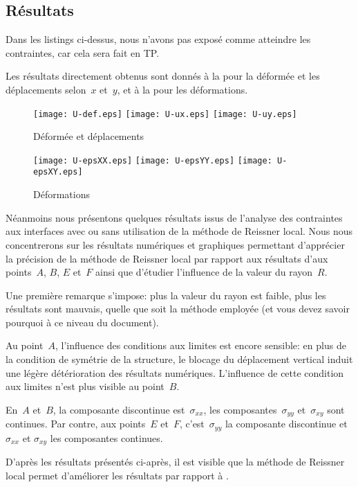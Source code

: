 \medskip
\subsection{Résultats}

Dans les listings ci-dessus, nous n'avons pas exposé comme atteindre les contraintes, car cela sera fait en TP.

Les résultats directement obtenus sont donnés à la  pour la déformée et les déplacements selon~$x$ et~$y$, et à la  pour les déformations.
\begin{figure}[h!]
  \texttt{[image: U-def.eps]} \hfill
  \texttt{[image: U-ux.eps]}\hfill
  \texttt{[image: U-uy.eps]}
  \caption{\label{Fig-poutU-disp} Déformée et déplacements}
\end{figure}
\begin{figure}[h!]
  \texttt{[image: U-epsXX.eps]} \hfill
  \texttt{[image: U-epsYY.eps]}\hfill
  \texttt{[image: U-epsXY.eps]}
  \caption{\label{Fig-poutU-eps} Déformations}
\end{figure}


\medskip
Néanmoins nous présentons quelques résultats issus de l'analyse des contraintes aux interfaces avec ou sans utilisation de la méthode de Reissner local. Nous nous concentrerons sur les résultats numériques et graphiques permettant d'apprécier la précision de la méthode de Reissner local par rapport aux résultats d'\ansys aux points~$A$, $B$, $E$ et~$F$ ainsi que d'étudier l'influence de la valeur du rayon~$R$.

\medskip
Une première remarque s'impose: plus la valeur du rayon est faible, plus les résultats sont mauvais, quelle que soit la méthode employée (et vous devez savoir pourquoi à ce niveau du document).

\medskip
Au point~$A$, l'influence des conditions aux limites est encore sensible: en plus de la condition de symétrie de la structure, le blocage du déplacement vertical induit une légère détérioration des résultats numériques. L'influence de cette condition aux limites n'est plus visible au point~$B$.

\medskip
En~$A$ et~$B$, la composante discontinue est~$\sigma_{xx}$, les composantes~$\sigma_{yy}$ et~$\sigma_{xy}$ sont continues. Par contre, aux points~$E$ et~$F$, c'est~$\sigma_{yy}$ la composante discontinue et~$\sigma_{xx}$ et $\sigma_{xy}$ les composantes continues.

\medskip
D'après les résultats présentés ci-après, il est visible que la méthode de Reissner local permet d'améliorer les résultats par rapport à \ansys.

